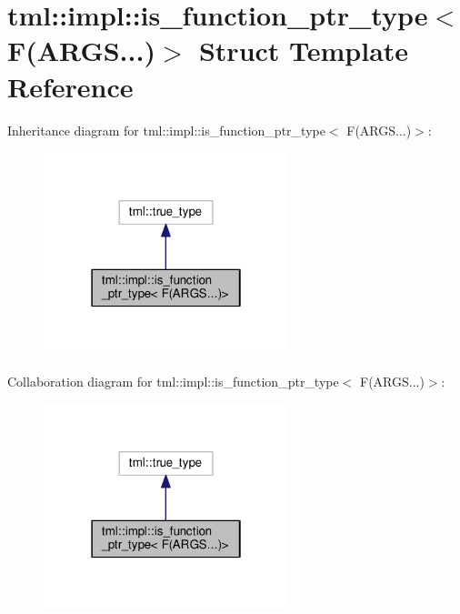 \hypertarget{structtml_1_1impl_1_1is__function__ptr__type_3_01_f_07_a_r_g_s_8_8_8_08_4}{\section{tml\+:\+:impl\+:\+:is\+\_\+function\+\_\+ptr\+\_\+type$<$ F(A\+R\+G\+S...)$>$ Struct Template Reference}
\label{structtml_1_1impl_1_1is__function__ptr__type_3_01_f_07_a_r_g_s_8_8_8_08_4}
}


Inheritance diagram for tml\+:\+:impl\+:\+:is\+\_\+function\+\_\+ptr\+\_\+type$<$ F(A\+R\+G\+S...)$>$\+:
\nopagebreak
\begin{figure}[H]
\begin{center}
\leavevmode
\includegraphics[width=202pt]{structtml_1_1impl_1_1is__function__ptr__type_3_01_f_07_a_r_g_s_8_8_8_08_4__inherit__graph}
\end{center}
\end{figure}


Collaboration diagram for tml\+:\+:impl\+:\+:is\+\_\+function\+\_\+ptr\+\_\+type$<$ F(A\+R\+G\+S...)$>$\+:
\nopagebreak
\begin{figure}[H]
\begin{center}
\leavevmode
\includegraphics[width=202pt]{structtml_1_1impl_1_1is__function__ptr__type_3_01_f_07_a_r_g_s_8_8_8_08_4__coll__graph}
\end{center}
\end{figure}


